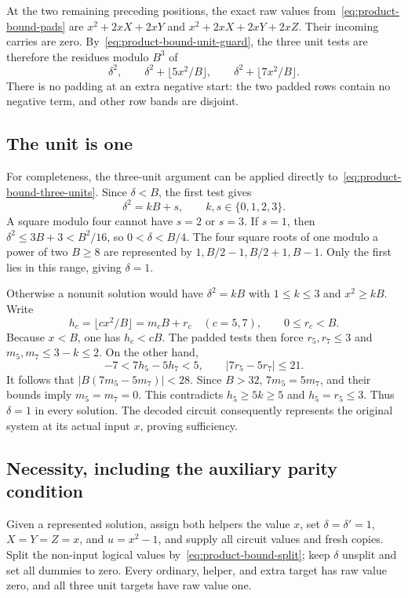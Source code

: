 At the two remaining preceding positions, the exact raw values
from~\eqref{eq:product-bound-pads} are
$x^2+2xX+2xY$ and $x^2+2xX+2xY+2xZ$. Their incoming carries
are zero. By~\eqref{eq:product-bound-unit-guard}, the three unit
tests are therefore the residues modulo $B^3$ of
\begin{equation}\label{eq:product-bound-three-units}
 \delta^2,\qquad
 \delta^2+\lfloor5x^2/B\rfloor,\qquad
 \delta^2+\lfloor7x^2/B\rfloor.
\end{equation}
There is no padding at an extra negative start: the two padded
rows contain no negative term, and other row bands are disjoint.

\subsection{The unit is one}

For completeness, the three-unit argument can be applied directly
to~\eqref{eq:product-bound-three-units}. Since $\delta<B$, the first
test gives
\[
 \delta^2=kB+s,\qquad k,s\in\{0,1,2,3\}.
\]
A square modulo four cannot have $s=2$ or $s=3$. If $s=1$, then
$\delta^2\le3B+3<B^2/16$, so $0<\delta<B/4$. The four square
roots of one modulo a power of two $B\ge8$ are represented by
$1,B/2-1,B/2+1,B-1$. Only the first lies in this range, giving
$\delta=1$.

Otherwise a nonunit solution would have $\delta^2=kB$ with
$1\le k\le3$ and $x^2\ge kB$. Write
\[
 h_c=\lfloor cx^2/B\rfloor=m_cB+r_c
 \quad(c=5,7),\qquad 0\le r_c<B.
\]
Because $x<B$, one has $h_c<cB$. The padded tests then force
$r_5,r_7\le3$ and $m_5,m_7\le3-k\le2$. On the other hand,
\[
 -7<7h_5-5h_7<5,\qquad |7r_5-5r_7|\le21.
\]
It follows that $|B(7m_5-5m_7)|<28$. Since $B>32$,
$7m_5=5m_7$, and their bounds imply $m_5=m_7=0$. This contradicts
$h_5\ge5k\ge5$ and $h_5=r_5\le3$. Thus $\delta=1$ in every
solution. The decoded circuit consequently represents the original
system at its actual input $x$, proving sufficiency.

\subsection{Necessity, including the auxiliary parity condition}

Given a represented solution, assign both helpers the value $x$,
set $\delta=\delta'=1$, $X=Y=Z=x$, and $u=x^2-1$, and supply all
circuit values and fresh copies. Split the non-input logical values
by~\eqref{eq:product-bound-split}; keep $\delta$ unsplit and set
all dummies to zero. Every ordinary, helper, and extra target has
raw value zero, and all three unit targets have raw value one.

